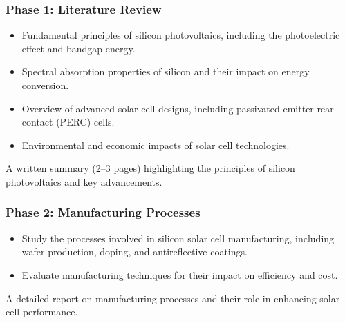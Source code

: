 \documentclass[letterpaper,10pt,english]{jupyterBook}
\begin{document}
\subsubsection{Phase 1: Literature Review}
\label{\detokenize{ProjectInstructions:phase-1-literature-review}}
\sphinxAtStartPar
{}
\begin{itemize}
\item {} 
\sphinxAtStartPar
Fundamental principles of silicon photovoltaics, including the
photoelectric effect and bandgap energy.

\item {} 
\sphinxAtStartPar
Spectral absorption properties of silicon and their impact on energy
conversion.

\item {} 
\sphinxAtStartPar
Overview of advanced solar cell designs, including passivated
emitter rear contact (PERC) cells.

\item {} 
\sphinxAtStartPar
Environmental and economic impacts of solar cell technologies.

\end{itemize}

\sphinxAtStartPar
{} A written summary (2–3 pages) highlighting the
principles of silicon photovoltaics and key advancements.


\subsubsection{Phase 2: Manufacturing Processes}
\label{\detokenize{ProjectInstructions:phase-2-manufacturing-processes}}
\sphinxAtStartPar
{}
\begin{itemize}
\item {} 
\sphinxAtStartPar
Study the processes involved in silicon solar cell manufacturing,
including wafer production, doping, and anti\sphinxhyphen{}reflective coatings.

\item {} 
\sphinxAtStartPar
Evaluate manufacturing techniques for their impact on efficiency and
cost.

\end{itemize}

\sphinxAtStartPar
{} A detailed report on manufacturing processes and their
role in enhancing solar cell performance.
\end{document}
